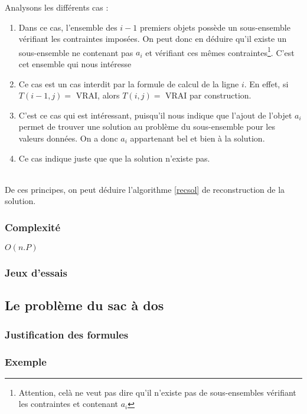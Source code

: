 Analysons les différents cas : \begin{enumerate}
	\item Dans ce cas, l'ensemble des $i-1$ premiers objets possède un sous-ensemble vérifiant les
		contraintes imposées. On peut donc en déduire qu'il existe un sous-ensemble ne contenant pas
		$a_i$ et vérifiant ces mêmes contraintes\footnote{Attention, celà ne veut pas dire qu'il
		n'existe pas de sous-ensembles vérifiant les contraintes et contenant $a_i$}. C'est cet ensemble
		qui nous intéresse
	\item Ce cas est un cas interdit par la formule de calcul de la ligne $i$. En effet, si $T(i-1, j)
		=$ VRAI, alors $T(i,j) =$ VRAI par construction.
	\item C'est ce cas qui est intéressant, puisqu'il nous indique que l'ajout de l'objet $a_i$ permet
		de trouver une solution au problème du sous-ensemble pour les valeurs données. On a donc $a_i$
		appartenant bel et bien à la solution.
	\item Ce cas indique juste que que la solution n'existe pas.
\end{enumerate}
~\\
De ces principes, on peut déduire l'algorithme \ref{recsol} de reconstruction de la solution.

\subsubsection{Complexité}
$O(n.P)$

\subsubsection{Jeux d'essais}


\subsection{Le problème du sac à dos}



\subsubsection{Justification des formules}

\subsubsection{Exemple}

